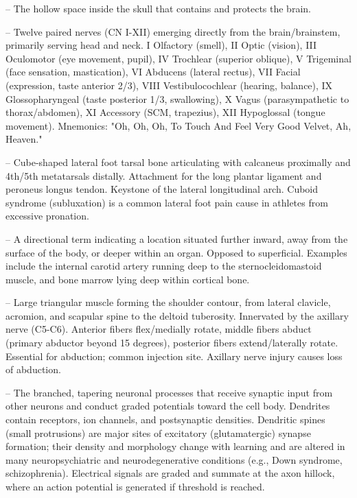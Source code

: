 -- The hollow space inside the skull that contains and protects the brain.

-- Twelve paired nerves (CN I-XII) emerging directly from the brain/brainstem, primarily serving head and neck. I Olfactory (smell), II Optic (vision), III Oculomotor (eye movement, pupil), IV Trochlear (superior oblique), V Trigeminal (face sensation, mastication), VI Abducens (lateral rectus), VII Facial (expression, taste anterior 2/3), VIII Vestibulocochlear (hearing, balance), IX Glossopharyngeal (taste posterior 1/3, swallowing), X Vagus (parasympathetic to thorax/abdomen), XI Accessory (SCM, trapezius), XII Hypoglossal (tongue movement). Mnemonics: "Oh, Oh, Oh, To Touch And Feel Very Good Velvet, Ah, Heaven."

-- Cube-shaped lateral foot tarsal bone articulating with calcaneus proximally and 4th/5th metatarsals distally. Attachment for the long plantar ligament and peroneus longus tendon. Keystone of the lateral longitudinal arch. Cuboid syndrome (subluxation) is a common lateral foot pain cause in athletes from excessive pronation.

-- A directional term indicating a location situated further inward, away from the surface of the body, or deeper within an organ. Opposed to superficial. Examples include the internal carotid artery running deep to the sternocleidomastoid muscle, and bone marrow lying deep within cortical bone.

-- Large triangular muscle forming the shoulder contour, from lateral clavicle, acromion, and scapular spine to the deltoid tuberosity. Innervated by the axillary nerve (C5-C6). Anterior fibers flex/medially rotate, middle fibers abduct (primary abductor beyond 15 degrees), posterior fibers extend/laterally rotate. Essential for abduction; common injection site. Axillary nerve injury causes loss of abduction.

-- The branched, tapering neuronal processes that receive synaptic input from other neurons and conduct graded potentials toward the cell body. Dendrites contain receptors, ion channels, and postsynaptic densities. Dendritic spines (small protrusions) are major sites of excitatory (glutamatergic) synapse formation; their density and morphology change with learning and are altered in many neuropsychiatric and neurodegenerative conditions (e.g., Down syndrome, schizophrenia). Electrical signals are graded and summate at the axon hillock, where an action potential is generated if threshold is reached.

